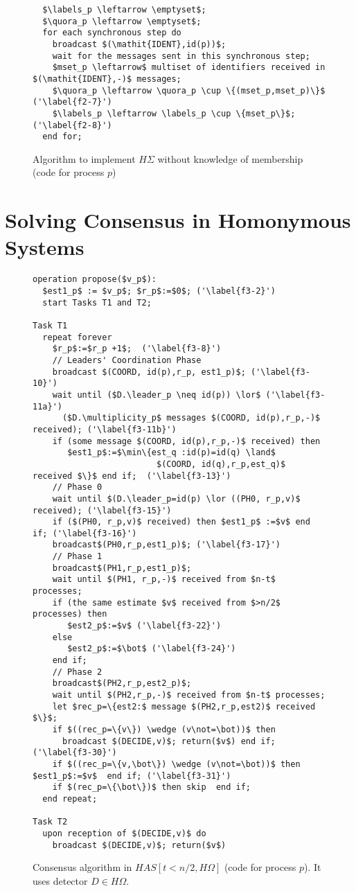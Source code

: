 \documentclass[10pt, conference, compsocconf]{IEEEtran}
\newcommand{\HO}{{H\Omega}}
\newcommand{\HS}{{H\Sigma}}
\newcommand{\leader}{{\mathit{h\_leader}}}
\newcommand{\multiplicity}{{\mathit{h\_multiplicity}}}
\newcommand{\quora}{{\mathit{h\_quora}}}
\newcommand{\labels}{{\mathit{h\_labels}}}
\begin{document}
\begin{figure}
\begin{lstlisting}
  $\labels_p \leftarrow \emptyset$;
  $\quora_p \leftarrow \emptyset$;
  for each synchronous step do
    broadcast $(\mathit{IDENT},id(p))$;
    wait for the messages sent in this synchronous step; 
    $mset_p \leftarrow$ multiset of identifiers received in $(\mathit{IDENT},-)$ messages;
    $\quora_p \leftarrow \quora_p \cup \{(mset_p,mset_p)\}$ ('\label{f2-7}')
    $\labels_p \leftarrow \labels_p \cup \{mset_p\}$; ('\label{f2-8}')
  end for;
\end{lstlisting}		
\caption{Algorithm to implement $\HS$ without knowledge of membership 
(code for process $p$)}
\label{Fig-HS}
\end{figure}



\section{Solving  Consensus in Homonymous Systems}
\label{sec:FDs-based-consensus}




\begin{figure}
\begin{lstlisting}
operation propose($v_p$): 
  $est1_p$ := $v_p$; $r_p$:=$0$; ('\label{f3-2}')
  start Tasks T1 and T2;
  
Task T1
  repeat forever
    $r_p$:=$r_p +1$;  ('\label{f3-8}')
    // Leaders' Coordination Phase
    broadcast $(COORD, id(p),r_p, est1_p)$; ('\label{f3-10}')
    wait until ($D.\leader_p \neq id(p)) \lor$ ('\label{f3-11a}')
      ($D.\multiplicity_p$ messages $(COORD, id(p),r_p,-)$ received); ('\label{f3-11b}')
    if (some message $(COORD, id(p),r_p,-)$ received) then 
       $est1_p$:=$\min\{est_q :id(p)=id(q) \land$
                         $(COORD, id(q),r_p,est_q)$ received $\}$ end if;  ('\label{f3-13}')
    // Phase 0
    wait until $(D.\leader_p=id(p) \lor ((PH0, r_p,v)$ received); ('\label{f3-15}')
    if ($(PH0, r_p,v)$ received) then $est1_p$ :=$v$ end if; ('\label{f3-16}')
    broadcast$(PH0,r_p,est1_p)$; ('\label{f3-17}')
    // Phase 1
    broadcast$(PH1,r_p,est1_p)$;
    wait until $(PH1, r_p,-)$ received from $n-t$ processes;
    if (the same estimate $v$ received from $>n/2$ processes) then 
       $est2_p$:=$v$ ('\label{f3-22}')
    else
       $est2_p$:=$\bot$ ('\label{f3-24}')
    end if;
    // Phase 2
    broadcast$(PH2,r_p,est2_p)$;
    wait until $(PH2,r_p,-)$ received from $n-t$ processes;
    let $rec_p=\{est2:$ message $(PH2,r_p,est2)$ received $\}$;
    if $((rec_p=\{v\}) \wedge (v\not=\bot))$ then 
      broadcast $(DECIDE,v)$; return($v$) end if; ('\label{f3-30}')
    if $((rec_p=\{v,\bot\}) \wedge (v\not=\bot))$ then  $est1_p$:=$v$  end if; ('\label{f3-31}')
    if $(rec_p=\{\bot\})$ then skip  end if;
  end repeat;

Task T2
  upon reception of $(DECIDE,v)$ do
    broadcast $(DECIDE,v)$; return($v$)
\end{lstlisting}
\caption{Consensus algorithm in $\mathit{HAS}[t < n/2,\HO]$
(code for process $p$).
It uses detector $D \in \HO$.
}
\label{Fig-Cons-HOmega}
\end{figure}
\end{document}
